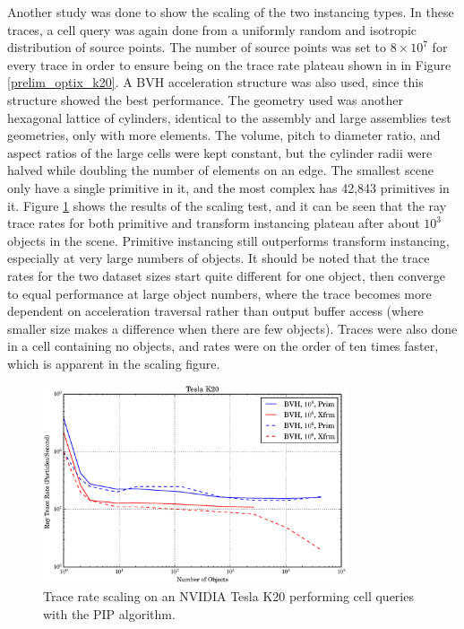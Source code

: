 Another study was done to show the scaling of the two instancing types.  In these traces, a cell query was again done from a uniformly random and isotropic distribution of source points.  The number of source points was set to $8\times10^7$ for every trace in order to ensure being on the trace rate plateau shown in in Figure \ref{prelim_optix_k20}.  A BVH acceleration structure was also used, since this structure showed the best performance.  The geometry used was another hexagonal lattice of cylinders, identical to the assembly and large assemblies test geometries, only with more elements.  The volume, pitch to diameter ratio, and aspect ratios of the large cells were kept constant, but the cylinder radii were halved while doubling the number of elements on an edge.  The smallest scene only have a single primitive in it, and the most complex has 42,843 primitives in it.  Figure \ref{prelim_optix_scaling} shows the results of the scaling test, and it can be seen that the ray trace rates for both primitive and transform instancing plateau after about $10^3$ objects in the scene.  Primitive instancing still outperforms transform instancing, especially at very large numbers of objects.  It should be noted that the trace rates for the two dataset sizes start quite different for one object, then converge to equal performance at large object numbers, where the trace becomes more dependent on acceleration traversal rather than output buffer access (where smaller size makes a difference when there are few objects).  Traces were also done in a cell containing no objects, and rates were on the order of ten times faster, which is apparent in the scaling figure.

\begin{figure}[h!] 
  \centering
    \includegraphics[width=0.8\textwidth]{graphics/prelim_optix_scaling.eps}
     \caption{Trace rate scaling on an NVIDIA Tesla K20 performing cell queries with the PIP algorithm. \label{prelim_optix_scaling} }
\end{figure}

